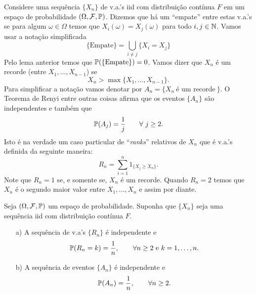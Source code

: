 \bigskip

Considere uma sequência $\{X_n\}$ de v.a.'s iid 
com distribuição contínua $F$ em um espaço de probabilidade
$(\Omega,\F,\P)$. 
Dizemos que há um ``empate'' entre estas v.a.'s  se
para algum $\omega\in\Omega$ temos que
$X_i(\omega)=X_j(\omega)$ para todo $i,j\in\N$.
Vamos usar a notação simplificada 
	\[
		\{ \text{Empate} \}
		=
		\bigcup_{i\neq j} \{X_i=X_j\}	
	\]
Pelo lema anterior temos que
$\P(\{\text{Empate}\})=0$.
Vamos dizer que $X_n$ é um recorde (entre $X_1,\ldots,X_{n-1}$)
se 
	\[ 
	X_n>\max\{X_1,\ldots,X_{n-1}\}.
	\]
Para simplificar a notação vamos denotar por 
$A_n = \{X_n \ \text{é um recorde}\ \}$.
O Teorema de Renyi entre outras coisas afirma que
os eventos $\{A_n\}$ são independentes e também que 
	\[
		\P(A_j)=\frac{1}{j}
		\qquad 
		\forall\ j\geq 2.
	\]
Isto é na verdade um caso particular de ``{\it ranks}''
relativos de $X_n$ que é v.a.'s definida da seguinte maneira:
	\[
		R_n = \sum_{i=1}^n 1_{\{X_j\geq X_n\}}.
	\]
Note que $R_n=1$ se, e somente se, $X_n$ é um recorde.
Quando $R_n=2$ temos que $X_n$ é o segundo maior 
valor entre $X_1,\ldots,X_n$ e assim por diante.








\begin{teorema}
	Seja $(\Omega,\F,\P)$ um espaço de probabilidade. 
	Suponha que $\{X_n\}$ seja uma sequência iid 
	com distribuição contínua $F$. 
	\begin{itemize}
		\item[a)] 
		A sequência de v.a's $\{R_n\}$ é independente e
			\[
				\P(R_n=k) = \frac{1}{n},
				\qquad \forall n\geq 2 \ \text{e}\ 
				k=1,\ldots,n.
			\]
		
		\item[b)]
		A sequência de eventos $\{A_n\}$ é 
		independente e 
			\[
				\P(A_n) = \frac{1}{n},\qquad \forall n\geq 2.
			\]
	\end{itemize}
\end{teorema} 







